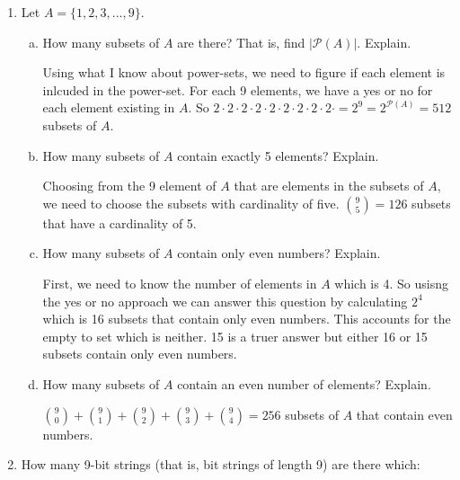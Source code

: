 \documentclass[11pt, a4paper]{article}
\newcommand\setItemNumber[1]{\setcounter{enumi}{\numexpr#1-1\relax}}
\begin{document}
    \begin{enumerate}

        \setItemNumber{3}
        \item Let $A = \{1,2,3,...,9\}$.

            \begin{enumerate}[(a)]

                \item How many subsets of $A$ are there? That is, find $|\mathcal{P}(A)|$. Explain.

                    Using what I know about power-sets, we need to figure if each element is inlcuded in the power-set. For each 9 elements, we have a yes or no for each element existing in $A$. So $2 \cdot 2 \cdot 2 \cdot 2 \cdot 2 \cdot 2 \cdot 2 \cdot 2 \cdot 2 \cdot = 2^9 = 2^{\mathcal{P}(A)} = 512$ subsets of $A$.

                \item How many subsets of $A$ contain exactly 5 elements? Explain.

                    Choosing from the 9 element of $A$ that are elements in the subsets of $A$, we need to choose the subsets with cardinality of five. ${9 \choose 5} = 126$ subsets that have a cardinality of 5.

                \item How many subsets of $A$ contain only even numbers? Explain.

                    First, we need to know the number of elements in $A$ which is 4. So usisng the yes or no approach we can answer this question by calculating $2^4$ which is 16 subsets that contain only even numbers. This accounts for the empty to set which is neither. 15 is a truer answer but either 16 or 15 subsets contain only even numbers.

                \item How many subsets of $A$ contain an even number of elements? Explain.

                    ${9\choose 0} + {9\choose 1} + {9\choose 2} + {9\choose 3} + {9\choose  4} = 256$ subsets of $A$ that contain even numbers.

            \end{enumerate}

        \item How many 9-bit strings (that is, bit strings of length 9) are there which:

            \begin{enumerate}[(a)]


\end{enumerate}
\end{enumerate}
\end{document}
